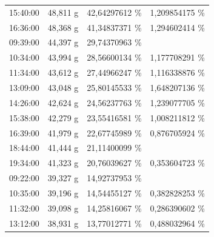 \begin{table}[]
\begin{tabular}{llll}
		\multicolumn{1}{l}{15:40:00} & \multicolumn{1}{l}{48,811 g} & \multicolumn{1}{l}{42,64297612   \%} & \multicolumn{1}{l}{1,209854175 \%} \\ 
		\multicolumn{1}{l}{16:36:00} & \multicolumn{1}{l}{48,368 g} & \multicolumn{1}{l}{41,34837371   \%} & \multicolumn{1}{l}{1,294602414 \%} \\ 
		\multicolumn{1}{l}{\cellcolor[HTML]{A5A5A5}09:39:00} & \multicolumn{1}{l}{44,397 g} & \multicolumn{1}{l}{29,74370963   \%} &  \\ 
		\multicolumn{1}{l}{10:34:00} & \multicolumn{1}{l}{43,994 g} & \multicolumn{1}{l}{28,56600134   \%} & \multicolumn{1}{l}{1,177708291 \%} \\ 
		\multicolumn{1}{l}{11:34:00} & \multicolumn{1}{l}{43,612 g} & \multicolumn{1}{l}{27,44966247   \%} & \multicolumn{1}{l}{1,116338876 \%} \\ 
		\multicolumn{1}{l}{13:09:00} & \multicolumn{1}{l}{43,048 g} & \multicolumn{1}{l}{25,80145533   \%} & \multicolumn{1}{l}{1,648207136 \%} \\ 
		\multicolumn{1}{l}{14:26:00} & \multicolumn{1}{l}{42,624 g} & \multicolumn{1}{l}{24,56237763   \%} & \multicolumn{1}{l}{1,239077705 \%} \\ 
		\multicolumn{1}{l}{15:38:00} & \multicolumn{1}{l}{42,279 g} & \multicolumn{1}{l}{23,55416581   \%} & \multicolumn{1}{l}{1,008211812 \%} \\ 
		\multicolumn{1}{l}{16:39:00} & \multicolumn{1}{l}{41,979 g} & \multicolumn{1}{l}{22,67745989   \%} & \multicolumn{1}{l}{0,876705924 \%} \\ 
		\multicolumn{1}{l}{18:44:00} & \multicolumn{1}{l}{41,444 g} & \multicolumn{1}{l}{21,11400099   \%} &  \\ 
		\multicolumn{1}{l}{19:34:00} & \multicolumn{1}{l}{41,323 g} & \multicolumn{1}{l}{20,76039627   \%} & \multicolumn{1}{l}{0,353604723 \%} \\ 
		\multicolumn{1}{l}{\cellcolor[HTML]{A5A5A5}09:22:00} & \multicolumn{1}{l}{39,327 g} & \multicolumn{1}{l}{14,92737953   \%} &  \\ 
		\multicolumn{1}{l}{10:35:00} & \multicolumn{1}{l}{39,196 g} & \multicolumn{1}{l}{14,54455127   \%} & \multicolumn{1}{l}{0,382828253 \%} \\ 
		\multicolumn{1}{l}{11:32:00} & \multicolumn{1}{l}{39,098 g} & \multicolumn{1}{l}{14,25816067   \%} & \multicolumn{1}{l}{0,286390602 \%} \\ 
		\multicolumn{1}{l}{13:12:00} & \multicolumn{1}{l}{38,931 g} & \multicolumn{1}{l}{13,77012771   \%} & \multicolumn{1}{l}{0,488032964 \%} \\ 

\end{tabular}
\end{table}
